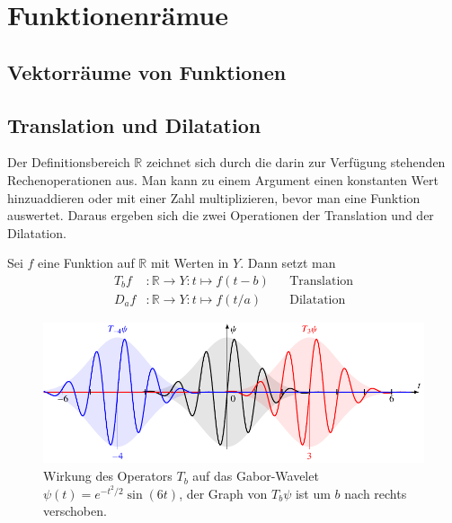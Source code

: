 %
%
%
\section{Funktionenrämue
\label{section:funktionenraume}}

\subsection{Vektorräume von Funktionen}

\subsection{Translation und Dilatation}
Der Definitionsbereich $\mathbb R$ zeichnet sich durch die darin zur
Verfügung stehenden Rechenoperationen aus.
Man kann zu einem Argument einen konstanten Wert hinzuaddieren oder mit
einer Zahl multiplizieren, bevor man eine Funktion auswertet.
Daraus ergeben sich die zwei Operationen der Translation und der Dilatation.

\begin{definition}
Sei $f$ eine Funktion auf $\mathbb R$ mit Werten in $Y$.
Dann setzt man
\begin{align*}
T_bf&\colon \mathbb R \to Y: t\mapsto f(t-b)&&\text{Translation}
\\
D_af&\colon \mathbb R \to Y: t\mapsto f(t/a)&&\text{Dilatation}
\end{align*}
\end{definition}

\begin{figure}
\centering
\includegraphics[width=\hsize]{chapters/1-geometrie/images/translation.pdf}
\caption{Wirkung des Operators $T_b$ auf das Gabor-Wavelet
$\psi(t) = e^{-t^2/2}\sin(6t)$,
der Graph von $T_b\psi$ ist um $b$ nach rechts verschoben.
\label{geometrie:Tb:image}}
\end{figure}


